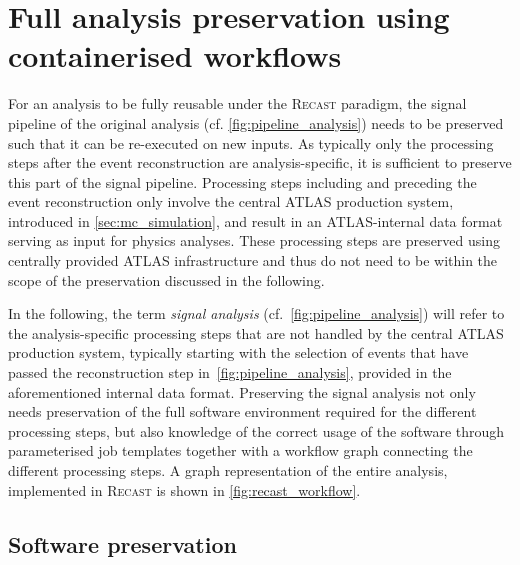 \section{Full analysis preservation using containerised workflows}\label{sec:recast_implementation}

For an analysis to be fully reusable under the \textsc{Recast} paradigm, the signal pipeline of the original analysis (cf. \cref{fig:pipeline_analysis}) needs to be preserved such that it can be re-executed on new inputs.
As typically only the processing steps after the event reconstruction are analysis-specific, it is sufficient to preserve this part of the signal pipeline.
Processing steps including and preceding the event reconstruction only involve the central ATLAS production system, introduced in \cref{sec:mc_simulation}, and result in an ATLAS-internal data format serving as input for physics analyses. These processing steps are preserved using centrally provided ATLAS infrastructure and thus do not need to be within the scope of the preservation discussed in the following.

 In the following, the term \textit{signal analysis} (cf.~\cref{fig:pipeline_analysis}) will refer to the analysis-specific processing steps that are not handled by the central ATLAS production system, typically starting with the selection of events that have passed the reconstruction step in~\cref{fig:pipeline_analysis}, provided in the aforementioned internal data format. Preserving the signal analysis not only needs preservation of the full software environment required for the different processing steps, but also knowledge of the correct usage of the software through parameterised job templates together with a workflow graph connecting the different processing steps. A graph representation of the entire analysis, implemented in \textsc{Recast} is shown in \cref{fig:recast_workflow}.

\subsection{Software preservation}

